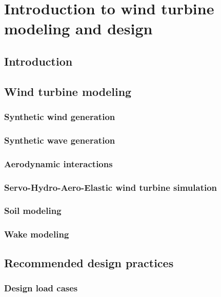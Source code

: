 \chapter{Introduction to wind turbine modeling and design}
    \section{Introduction}
    \section{Wind turbine modeling}
        \subsection{Synthetic wind generation }
        \subsection{Synthetic wave generation}
        \subsection{Aerodynamic interactions}
        \subsection{Servo-Hydro-Aero-Elastic wind turbine simulation }
        \subsection{Soil modeling}
        \subsection{Wake modeling }
    \section{Recommended design practices}
        \subsection{Design load cases}
